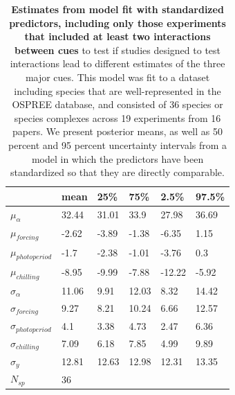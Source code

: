 \documentclass{article}
\begin{document}
\begin{footnotesize}
\begin{table}[ht]
\centering
\caption{\textbf{Estimates from model fit with standardized predictors, including only those experiments that included at least two interactions between cues} to test if studies designed to test interactions lead to different estimates of the three major cues. This model was fit to a dataset including species that are well-represented in the OSPREE database, and consisted of 36 species or species complexes across 19 experiments from 16 papers. We present posterior means, as well as 50 percent and 95 percent uncertainty intervals from a model in which the predictors have been standardized so that they are directly comparable.} 
\label{tab:intxnmod}
\begingroup\footnotesize
\begin{tabular}{|p{}|p{}p{}p{}p{}p{}|}
  \hline
 & mean & 25\% & 75\% & 2.5\% & 97.5\% \\ 
  \hline
$\mu_{\alpha}$ & 32.44 & 31.01 & 33.9 & 27.98 & 36.69 \\ 
  $\mu_{forcing}$ & -2.62 & -3.89 & -1.38 & -6.35 & 1.15 \\ 
  $\mu_{photoperiod}$ & -1.7 & -2.38 & -1.01 & -3.76 & 0.3 \\ 
  $\mu_{chilling}$ & -8.95 & -9.99 & -7.88 & -12.22 & -5.92 \\ 
  $\sigma_{\alpha}$ & 11.06 & 9.91 & 12.03 & 8.32 & 14.42 \\ 
  $\sigma_{forcing}$ & 9.27 & 8.21 & 10.24 & 6.66 & 12.57 \\ 
  $\sigma_{photoperiod}$ & 4.1 & 3.38 & 4.73 & 2.47 & 6.36 \\ 
  $\sigma_{chilling}$ & 7.09 & 6.18 & 7.85 & 4.99 & 9.89 \\ 
  $\sigma_{y}$ & 12.81 & 12.63 & 12.98 & 12.31 & 13.35 \\ 
   \hline
$N_{sp}$ & 36 &  &  &  &  \\ 
   \hline
\end{tabular}
\endgroup
\end{table}



\end{footnotesize}
\end{document}
